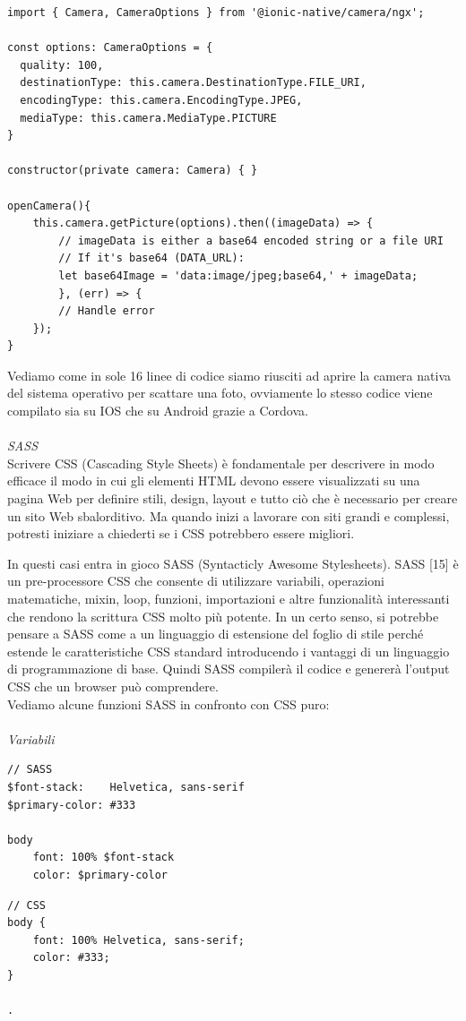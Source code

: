 \begin{lstlisting}
import { Camera, CameraOptions } from '@ionic-native/camera/ngx';

const options: CameraOptions = {
  quality: 100,
  destinationType: this.camera.DestinationType.FILE_URI,
  encodingType: this.camera.EncodingType.JPEG,
  mediaType: this.camera.MediaType.PICTURE
}

constructor(private camera: Camera) { }

openCamera(){
    this.camera.getPicture(options).then((imageData) => {
        // imageData is either a base64 encoded string or a file URI
        // If it's base64 (DATA_URL):
        let base64Image = 'data:image/jpeg;base64,' + imageData;
        }, (err) => {
        // Handle error
    });
}
\end{lstlisting}

Vediamo come in sole 16 linee di codice siamo riusciti ad aprire la camera nativa del sistema operativo per scattare
una foto, ovviamente lo stesso codice viene compilato sia su IOS che su Android grazie a Cordova.
\\\\
\textit{SASS}\\
Scrivere CSS (Cascading Style Sheets) è fondamentale per descrivere in modo efficace il modo in cui gli elementi HTML devono 
essere visualizzati su una pagina Web per definire stili, design, layout e tutto ciò che è necessario per creare un sito 
Web sbalorditivo. Ma quando inizi a lavorare con siti grandi e complessi, potresti iniziare a chiederti se i CSS potrebbero 
essere migliori. 

In questi casi entra in gioco SASS (Syntacticly Awesome Stylesheets).
SASS [15] è un pre-processore CSS che consente di utilizzare variabili, operazioni matematiche, mixin, loop, funzioni, importazioni 
e altre funzionalità interessanti che rendono la scrittura CSS molto più potente. In un certo senso, si potrebbe pensare a 
SASS come a un linguaggio di estensione del foglio di stile perché estende le caratteristiche CSS standard introducendo i
vantaggi di un linguaggio di programmazione di base. Quindi SASS compilerà il codice e genererà l'output CSS che un
browser può comprendere. \\
Vediamo alcune funzioni SASS in confronto con CSS puro:\\\\

\textit{Variabili}
\begin{multicols}{2}
    \begin{lstlisting}
// SASS
$font-stack:    Helvetica, sans-serif
$primary-color: #333

body
    font: 100% $font-stack
    color: $primary-color
    \end{lstlisting}
    \columnbreak
    \begin{lstlisting}
// CSS
body {
    font: 100% Helvetica, sans-serif;
    color: #333;
} 

.
    \end{lstlisting}
\end{multicols}

